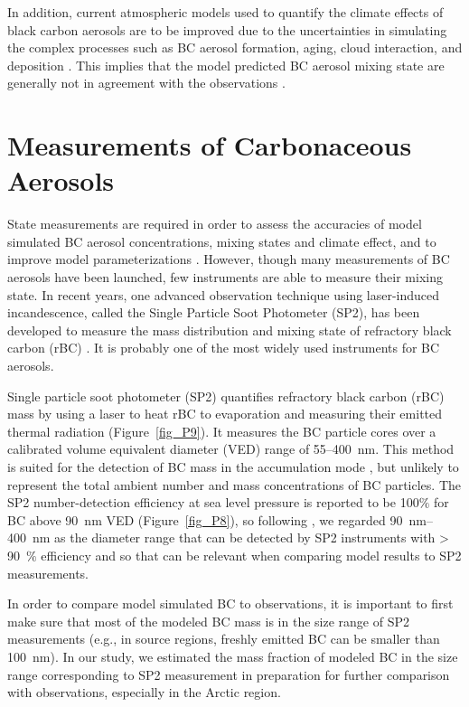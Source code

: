 \documentclass[12pt, fullpage]{uiucthesis2009}
\begin{document}
	In addition, current atmospheric models used to quantify the climate effects of black carbon aerosols are to be improved due to the uncertainties in simulating the complex processes such as BC aerosol formation, aging, cloud interaction, and deposition \citep{Kipling2016}. This implies that the model predicted BC aerosol mixing state are generally not in agreement with the observations \citep{Raatikainen2015}. 
	
	\section{Measurements of Carbonaceous Aerosols}
	State measurements are required in order to assess the accuracies of model simulated BC aerosol concentrations, mixing states and climate effect, and to improve model parameterizations \citep[e.g.][]{Reddington2013,Reddington2013}. However, though many measurements of BC aerosols have been launched, few instruments are able to measure their mixing state. In recent years, one advanced observation technique using laser-induced incandescence, called the Single Particle Soot Photometer (SP2), has been developed to measure the mass distribution and mixing state of refractory black carbon (rBC) \citep[][]{baumgardner2004warming,schulz2006radiative}. It is probably one of the most widely used instruments for BC aerosols. 
	
	Single particle soot photometer (SP2) quantifies refractory black carbon (rBC) mass by using a laser to heat rBC to evaporation and measuring their emitted thermal radiation (Figure~\ref{fig_P9}). It measures the BC particle cores over a calibrated volume equivalent diameter (VED) range of 55--400~nm. This method is suited for the detection of BC mass in the accumulation mode \citep{schwarz2010global}, but unlikely to represent the total ambient number and mass concentrations of BC particles. The SP2 number-detection efficiency at sea level pressure is reported to be 100$\%$ for BC above 90~nm VED \citep{schwarz2010global} (Figure~\ref{fig_P8}), so following \citet{Reddington2013}, we regarded 90~nm--400~nm as the diameter range that can be detected by SP2 instruments with > 90~$\%$ efficiency and so that can be relevant when comparing model results to SP2 measurements.
	
	In order to compare model simulated BC to observations, it is important to first make sure that most of the modeled BC mass is in the size range of SP2 measurements (e.g., in source regions, freshly emitted BC can be smaller than 100~nm). In our study, we estimated the mass fraction of modeled BC in the size range corresponding to SP2 measurement in preparation for further comparison with observations, especially in the Arctic region.
	
\end{document}
